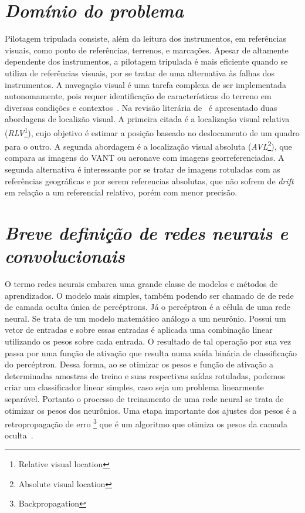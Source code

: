 

\section{\textit{Domínio do problema}}\label{sec:Cap2_dominio}

Pilotagem tripulada consiste, além da leitura dos instrumentos, em referências visuais, como ponto de referências, terrenos, e marcações. Apesar de altamente dependente dos instrumentos, a pilotagem tripulada é mais eficiente quando se utiliza de referências visuais, por se tratar de uma alternativa às falhas dos instrumentos. A navegação visual é uma tarefa complexa de ser implementada autonomamente, pois requer identificação de características do terreno em diversas condições e contextos~\cite{rs13194017}. Na revisão literária de~\cite{COUTURIER2021103666} é apresentado duas abordagens de localizão visual. A primeira citada é a localização visual relativa (\textit{RLV}\footnote{Relative visual location}), cujo objetivo é estimar a posição baseado no deslocamento de um quadro para o outro. A segunda abordagem é a localização visual absoluta (\textit{AVL}\footnote{Absolute visual location}), que compara as imagens do VANT ou aeronave com imagens georreferenciadas. A segunda alternativa é interessante por se tratar de imagens rotuladas com as referências geográficas e por serem referencias absolutas, que não sofrem de \textit{drift} em relação a um referencial relativo, porém com menor precisão. 


\section{\textit{Breve definição de redes neurais e convolucionais}}\label{sec:Cap2_definicoes}

O termo redes neurais embarca uma grande classe de modelos e métodos de aprendizados. O modelo mais simples, também podendo ser chamado de de rede de camada oculta única de percéptrons. Já o  percéptron é a célula de uma rede neural. Se trata de um modelo matemático análogo a um neurônio. Possui um vetor de entradas e sobre essas entradas é aplicada uma combinação linear utilizando os pesos sobre cada entrada. O resultado de tal operação por sua vez passa por uma função de ativação que resulta numa saída binária de classificação do percéptron. Dessa forma, ao se otimizar os pesos e função de ativação a determinadas amostras de treino e suas respectivas saídas rotuladas, podemos criar um classificador linear simples, caso seja um problema linearmente separável. Portanto o processo de treinamento de uma rede neural se trata de otimizar os pesos dos neurônios. Uma etapa importante dos ajustes dos pesos é a retropropagação de erro \footnote{Backpropagation} que é um algoritmo que otimiza os pesos da camada oculta~\cite{hastie01statisticallearning}. 

